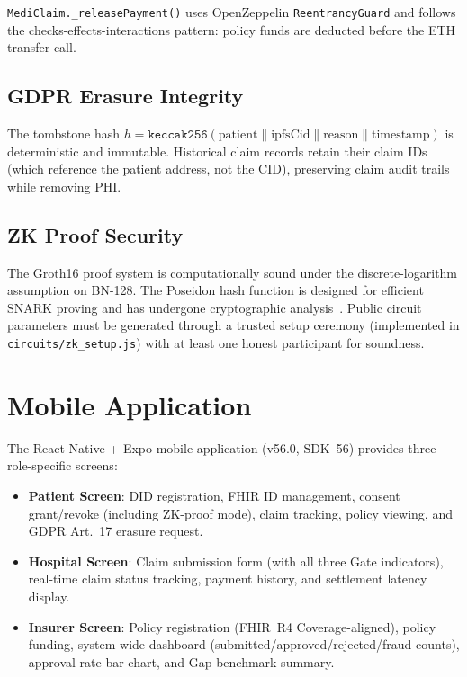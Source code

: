 \documentclass[journal]{IEEEtran}
\begin{document}
\texttt{MediClaim.\_releasePayment()} uses OpenZeppelin \texttt{ReentrancyGuard}
and follows the checks-effects-interactions pattern: policy funds are deducted
before the ETH transfer call.

\subsection{GDPR Erasure Integrity}

The tombstone hash $h = \mathtt{keccak256}(\text{patient} \| \text{ipfsCid} \|
\text{reason} \| \text{timestamp})$ is deterministic and immutable. Historical
claim records retain their claim IDs (which reference the patient address, not
the CID), preserving claim audit trails while removing PHI.

\subsection{ZK Proof Security}

The Groth16 proof system is computationally sound under the discrete-logarithm
assumption on BN-128. The Poseidon hash function is designed for efficient
SNARK proving and has undergone cryptographic analysis~\cite{poseidon}.
Public circuit parameters must be generated through a trusted setup ceremony
(implemented in \texttt{circuits/zk\_setup.js}) with at least one honest
participant for soundness.

\section{Mobile Application}
\label{sec:mobile}

The React Native + Expo mobile application (v56.0, SDK~56) provides three
role-specific screens:

\begin{itemize}
  \item \textbf{Patient Screen}: DID registration, FHIR ID management,
        consent grant/revoke (including ZK-proof mode), claim tracking,
        policy viewing, and GDPR Art.~17 erasure request.
  \item \textbf{Hospital Screen}: Claim submission form (with all three Gate
        indicators), real-time claim status tracking, payment history, and
        settlement latency display.
  \item \textbf{Insurer Screen}: Policy registration (FHIR~R4 Coverage-aligned),
        policy funding, system-wide dashboard (submitted/approved/rejected/fraud
        counts), approval rate bar chart, and Gap benchmark summary.
\end{itemize}
\end{document}
